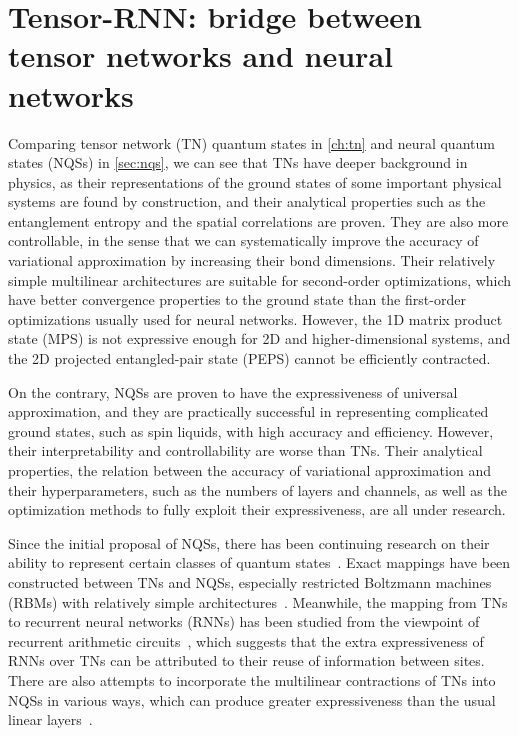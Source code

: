 \chapter{Tensor-RNN: bridge between tensor networks and neural networks}
\label{ch:tensor-rnn}

Comparing tensor network (TN) quantum states in \cref{ch:tn} and neural quantum states (NQSs) in \cref{sec:nqs}, we can see that TNs have deeper background in physics, as their representations of the ground states of some important physical systems are found by construction, and their analytical properties such as the entanglement entropy and the spatial correlations are proven. They are also more controllable, in the sense that we can systematically improve the accuracy of variational approximation by increasing their bond dimensions. Their relatively simple multilinear architectures are suitable for second-order optimizations, which have better convergence properties to the ground state than the first-order optimizations usually used for neural networks. However, the 1D matrix product state (MPS) is not expressive enough for 2D and higher-dimensional systems, and the 2D projected entangled-pair state (PEPS) cannot be efficiently contracted.

On the contrary, NQSs are proven to have the expressiveness of universal approximation, and they are practically successful in representing complicated ground states, such as spin liquids, with high accuracy and efficiency. However, their interpretability and controllability are worse than TNs. Their analytical properties, the relation between the accuracy of variational approximation and their hyperparameters, such as the numbers of layers and channels, as well as the optimization methods to fully exploit their expressiveness, are all under research.

Since the initial proposal of NQSs, there has been continuing research on their ability to represent certain classes of quantum states~\cite{gao2017efficient, carleo2018constructing, sharir2022neural}. Exact mappings have been constructed between TNs and NQSs, especially restricted Boltzmann machines (RBMs) with relatively simple architectures~\cite{glasser2018neural, chen2018equivalence}. Meanwhile, the mapping from TNs to recurrent neural networks (RNNs) has been studied from the viewpoint of recurrent arithmetic circuits~\cite{levine2017long, levine2019quantum}, which suggests that the extra expressiveness of RNNs over TNs can be attributed to their reuse of information between sites. There are also attempts to incorporate the multilinear contractions of TNs into NQSs in various ways, which can produce greater expressiveness than the usual linear layers~\cite{hibat2021variational, hibat2022supplementing, chen2023antn}.

